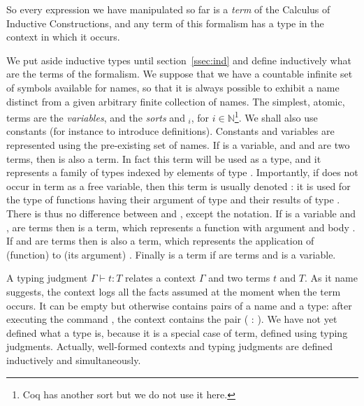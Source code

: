 So every expression we have manipulated so far is a \emph{term} of the
Calculus of Inductive Constructions, and any term of this formalism
has a type in the context in which it occurs.

We put aside inductive types until section~\ref{ssec:ind} and define
inductively what are the terms of the formalism. We suppose that we
have a countable infinite set of symbols available for names, so that it is
always possible to exhibit a name distinct from a given arbitrary
finite collection of names. The simplest, atomic, terms are the
\emph{variables}, and the \emph{sorts}  and $_i$, for
$i \in \mathbb{N}$\footnote{Coq has
another sort  but we do not use it here.}. We shall also
use constants (for instance to introduce definitions). Constants and
variables are represented using the pre-existing set of names. If  is a
variable, and  and  are two terms, then  is
also a term. In fact this term will be used as a type, and it
represents a family of types  indexed by elements of type .
Importantly, if  does not occur in term  as a
free variable, then this term is usually denoted : it is
used for the type of functions having their argument of type  and
their results of type . There is thus no difference
between  and , except the
notation. If  is a variable and , 
are terms then  is a term, which represents a function
with argument  and body . If  and  are terms then
 is also a term, which represents the application of (function)
 to (its argument) . Finally  is a term
if  are terms and  is a variable.

A typing judgment $\Gamma \vdash t : T$ relates a
context $\Gamma$ and two terms $t$ and $T$. As it name suggests,
the context logs all the facts assumed at the moment when the term
occurs. It can be empty but otherwise contains pairs of a name and a
type: after executing the command , the context
contains the pair ( : ). We have not yet defined what a
type is, because it is a special case of term, defined using typing
judgments. Actually, well-formed contexts and typing judgments are
defined inductively and simultaneously.

